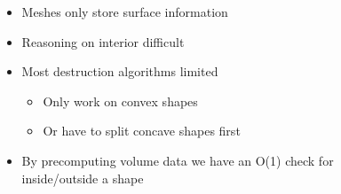 \documentclass{beamer}
\begin{document}
\begin{frame}
\begin{columns}[T]
\begin{column}[T]{5cm}
\begin{figure}
				\end{figure}
			\end{column}
			\begin{column}[T]{5cm} %
				\begin{itemize}
				\item{Meshes only store surface information}
				\item{Reasoning on interior difficult}
				\item{Most destruction algorithms limited}
					\begin{itemize}
							\item{Only work on convex shapes}
							\item{Or have to split concave shapes first}
					\end{itemize}
				\end{itemize}
				\begin{itemize}
				\item{By precomputing volume data we have an O(1) check for inside/outside a shape}
				\end{itemize}
			\end{column}
		\end{columns}	
	\end{frame}
\end{document}
